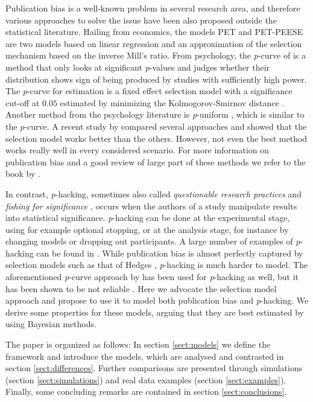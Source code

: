 \documentclass{article}
\theoremstyle{plain}
\theoremstyle{definition}
\begin{document}
Publication bias is a well-known problem in several research area, and therefore various approaches to solve the issue have been also proposed outside the statistical literature. Hailing from economics, the models PET and PET-PEESE \citep{stanley2014meta,stanley2017limitations} are two models based on linear regression and an approximation of the selection mechanism based on the inverse Mill's ratio. From psychology, the \textit{p}-curve of \citet{simonsohn2014p} is a method that only looks at significant \textit{p}-values and judges whether their distribution shows sign of being produced by studies with sufficiently high power. The \textit{p}-curve for estimation \citep{simonsohn2014} is a fixed effect selection model with a significance cut-off at $0.05$ estimated by minimizing the Kolmogorov-Smirnov distance \citep{mcshane2016adjusting}. Another method from the psychology literature is \textit{p}-uniform \citep{van2015meta}, which is similar to the \textit{p}-curve. A recent study by \citet{carter2019correcting} compared several approaches and showed that the selection model works better than the others. However, not even the best method works really well in every considered scenario. For more information on publication bias and a good review of large part of these methods we refer to the book by \citet{rothstein2006publication}.

In contrast, \textit{p}-hacking, sometimes also called \emph{questionable research practices} \citep{Sijtsma2016} and \emph{fishing for significance} \citep{Boulesteix2009}, occurs when the authors of a study manipulate results into statistical significance. \textit{p}-hacking can be done at the experimental stage, using for example optional stopping, or at the analysis stage, for instance by changing models or dropping out participants. A large number of examples of \textit{p}-hacking can be found in \citet{simmons2011false}. While publication bias is almost perfectly captured by selection models such as that of Hedges \citeyearpar{hedges1992modeling}, \textit{p}-hacking is much harder to model. The aforementioned \textit{p}-curve approach by \citet{simonsohn2014p} has been used for \textit{p}-hacking as well, but it has been shown to be not reliable \citep{BrunsIoannidis2016}. Here we advocate the selection model approach and propose to use it to model both publication bias and \textit{p}-hacking. We derive some properties for these models, arguing that they are best estimated by using Bayesian methods. 

The paper is organized as follows: In section \ref{sect:models} we define the framework and introduce the models, which are analysed and contrasted in section \ref{sect:differences}. Further comparisons are presented through simulations (section \ref{sect:simulations}) and real data examples (section \ref{sect:examples}). Finally, some concluding remarks are contained in section \ref{sect:conclusions}.
\end{document}
